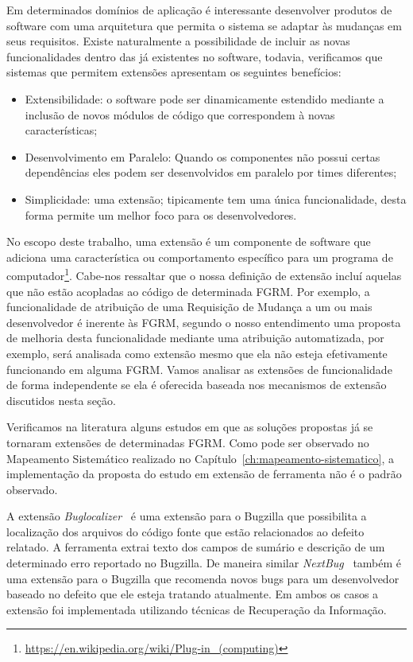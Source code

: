 Em determinados domínios de aplicação é interessante desenvolver produtos de
software com uma arquitetura que permita o sistema se adaptar às mudanças em
seus requisitos. Existe naturalmente a possibilidade de incluir as novas
funcionalidades dentro das já existentes no software, todavia, verificamos que
sistemas que permitem extensões apresentam os seguintes benefícios:

\begin{itemize}
	\item Extensibilidade: o software pode ser dinamicamente estendido mediante
		a inclusão de novos módulos de código que correspondem à novas
		características;
	\item Desenvolvimento em Paralelo: Quando os componentes não possui certas
		dependências eles podem ser desenvolvidos em paralelo por times
		diferentes;
	\item Simplicidade: uma  extensão; tipicamente tem uma única funcionalidade,
		desta forma permite um melhor foco para os desenvolvedores.
\end{itemize}

No escopo deste trabalho, uma extensão é um componente de software que adiciona
uma característica ou comportamento específico para um programa de
computador\footnote{\url{https://en.wikipedia.org/wiki/Plug-in\_(computing)}}.
Cabe-nos ressaltar que o nossa definição de extensão incluí aquelas que não
estão acopladas ao código de determinada FGRM\@. Por exemplo, a funcionalidade
de atribuição de uma Requisição de Mudança a um ou mais desenvolvedor é inerente
às FGRM, segundo o nosso entendimento uma proposta de melhoria desta
funcionalidade mediante uma atribuição automatizada, por exemplo, será analisada
como extensão mesmo que ela não esteja efetivamente funcionando em alguma
FGRM\@. Vamos a\-na\-li\-sar as extensões de funcionalidade de forma
independente se ela é oferecida baseada nos mecanismos de extensão discutidos
nesta seção.

Verificamos na literatura alguns estudos em que as soluções propostas já se
tornaram extensões de determinadas FGRM\@. Como pode ser observado no Mapeamento
Sistemático realizado no Capítulo~\ref{ch:mapeamento-sistematico}, a
implementação da proposta do estudo em extensão de ferramenta não é o padrão
observado.

A extensão \textit{Buglocalizer}~\cite{Thung:2014:BIT:2635868.2661678} é uma
extensão para o Bugzilla que possibilita a localização dos arquivos do código
fonte que estão relacionados ao defeito relatado. A ferramenta extrai texto dos
campos de sumário e descrição de um determinado erro reportado no Bugzilla. De
maneira similar \textit{NextBug}~\cite{101186} também é uma extensão para o
Bugzilla que recomenda novos bugs para um desenvolvedor baseado no defeito que
ele esteja tratando atualmente. Em ambos os casos a extensão foi implementada
utilizando técnicas de Recuperação da Informação.

